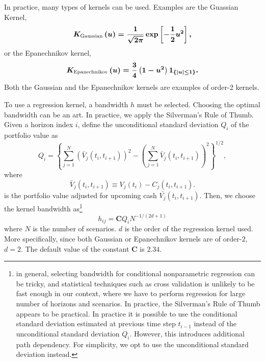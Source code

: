 \documentclass[preprint,12pt]{elsarticle}
\begin{document}
In practice, many types of kernels can be used. Examples are
 the Guassian Kernel,
\begin{equation}
\boldmath{K}_{\textrm{Gaussian}}\left(u\right)=\frac{1}{\sqrt{2\pi}}\exp\left[-\frac{1}{2}u^{2}\right],
\end{equation}
or the Epanechnikov kernel,
\begin{equation}
\boldmath{\boldmath{K}}_{\textrm{Epanechnikov}}\left(u\right)=\frac{3}{4}\left(1-u^{2}\right)\mathbf{1}_{\left\{ |u|\le1\right\} }.
\end{equation}
Both the Gaussian and the Epanechnikov kernels are examples of order-2 kernels\cite{Hansen2017Econometrics}.

To use a regression kernel, a bandwidth $h$ must be selected. Choosing the optimal bandwidth can be an art. In practice, we apply the Silverman's Rule of Thumb\citep{Hansen2017Econometrics,Silverman1986Density}. Given a horizon index $i$, define the unconditional standard deviation $Q_{i}$ of the portfolio value as
\begin{equation}
Q_{i}=\left\{ \sum_{j=1}^{N}\left(\bar{V}_{j}(t_{i},t_{i+1})\right)^{2}-\left(\sum_{j=1}^{N}\bar{V}_{j}(t_{i},t_{i+1})\right)^{2}\right\} ^{1/2},
\end{equation}
where
\begin{equation}\label{eq:cashAdjustedPV}
\bar{V}_{j}(t_{i},t_{i+1})\equiv V_{j}(t_{i})-C_{j}(t_{i},t_{i+1}).
\end{equation}
is the portfolio value adjusted for upcoming cash $\bar{V_{j}}(t_{i},t_{i+1})$.
Then, we choose the kernel bandwidth as\footnote{in general, selecting bandwidth for conditional nonparametric regression can be tricky, and statistical techniques such as cross validation\citep{Hansen2017Econometrics} is unlikely to be fast enough in our context, where we have to perform regression for large number of horizons and scenarios. In practice, the Silverman's Rule of Thumb appears to be practical. In practice it is possible to use the conditional standard deviation estimated at previous time step $t_{i-1}$ instead of the unconditional standard deviation $Q_{i}$. However, this introduces additional path dependency. For simplicity, we opt to use the unconditional standard deviation instead.}
\begin{equation}
h_{ij}=\mathbf{C}Q_{i}N^{-1/\left(2d+1\right)}
\end{equation}
where $N$ is the number of scenarios. $d$ is the order of the regression kernel used. More specifically, since both Gaussian or Epanechnikov kernels are of order-$2$, $d=2$. The default value of the constant $\mathbf{C}$ is $2.34$.
\end{document}
